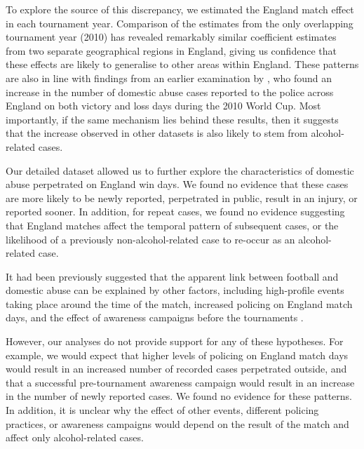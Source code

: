 \documentclass[12pt, a4paper]{article}
\begin{document}
To explore the source of this discrepancy, we estimated the England match effect in each tournament year. Comparison of the estimates from the only overlapping tournament year (2010) has revealed remarkably similar coefficient estimates from two separate geographical regions in England, giving us confidence that these effects are likely to generalise to other areas within England. These patterns are also in line with findings from an earlier examination by \cite{Brimicombe2012}, who found an increase in the number of domestic abuse cases reported to the police across England on both victory and loss days during the 2010 World Cup.  Most importantly, if the same mechanism lies behind these results, then it suggests that the increase observed in other datasets is also likely to stem from alcohol-related cases. 

Our detailed dataset allowed us to further explore the characteristics of domestic abuse perpetrated on England win days. We found no evidence that these cases are more likely to be newly reported, perpetrated in public, result in an injury, or reported sooner. In addition, for repeat cases, we found no evidence suggesting that England matches affect the temporal pattern of subsequent cases, or the likelihood of a previously non-alcohol-related case to re-occur as an alcohol-related case. 




It had been previously suggested that the apparent link between football and domestic abuse can be explained by other factors, including high-profile events taking place around the time of the match, increased policing on England match days, and the effect of awareness campaigns before the tournaments \cite{Brooks-Hay2018}. 

However, our analyses do not provide support for any of these hypotheses. For example, we would expect that higher levels of policing on England match days would result in an increased number of recorded cases perpetrated outside, and that a successful pre-tournament awareness campaign would result in an increase in the number of newly reported cases. We found no evidence for these patterns. In addition, it is unclear why the effect of other events, different policing practices, or awareness campaigns would depend on the result of the match and affect only alcohol-related cases. 
\end{document}
